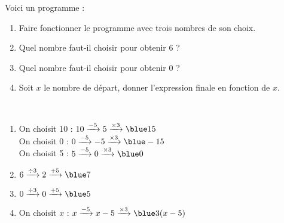 \begin{colonne*exercice}
\begin{exercice} %
   Voici un programme :
   \begin{center}
   \end{center}
   \begin{enumerate}
      \item Faire fonctionner le programme avec trois nombres de son choix.
      \item Quel nombre faut-il choisir pour obtenir 6 ?
      \item Quel nombre faut-il choisir pour obtenir 0 ?
      \item Soit $x$ le nombre de départ, donner l'expression finale en fonction de $x$.
   \end{enumerate}
\end{exercice}

\begin{corrige}
   \ \\ [-5mm]
   \begin{enumerate}
      \item On choisit 10 : $10\xrightarrow{-5}5\xrightarrow{\times3}\blue15$ \\ \smallskip
      On choisit 0 : $0\xrightarrow{-5}-5\xrightarrow{\times3}\blue-15$ \\ \smallskip
      On choisit 5 : $5\xrightarrow{-5}0\xrightarrow{\times3}\blue0$ \smallskip

      \item $6\xrightarrow{\div3}2\xrightarrow{+5}\blue7$ \smallskip
      \item $0\xrightarrow{\div3}0\xrightarrow{+5}\blue5$ \smallskip
      \item On choisit $x$ : $x\xrightarrow{-5}x-5\xrightarrow{\times3}\blue3(x-5)$
   \end{enumerate}
\end{corrige}

\smallskip


\end{colonne*exercice}
